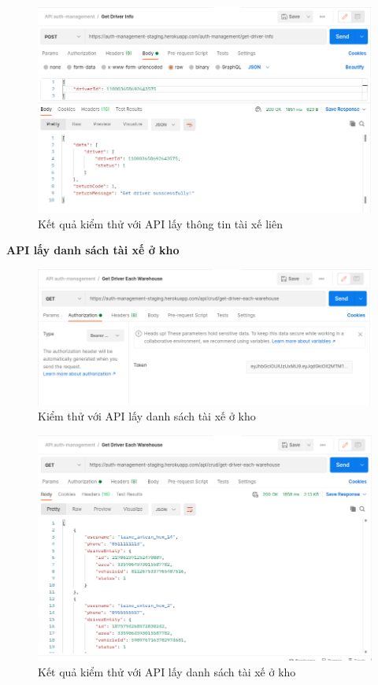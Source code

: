 		\begin{figure}[H]
			\includegraphics[width=1\textwidth]{Images/testing/API-get-driver-info-result.png}
			\centering
			\linebreak
			\caption{Kết quả kiểm thử với API lấy thông tin tài xế liên}
		\end{figure}
		
		\newpage
		\textbf{API lấy danh sách tài xế ở kho}
		
		\begin{figure}[H]
			\includegraphics[width=1\textwidth]{Images/testing/API-get-driver-warehouse.png}
			\centering
			\linebreak
			\caption{Kiểm thử với API lấy danh sách tài xế ở kho}
		\end{figure}
		
		\begin{figure}[H]
			\includegraphics[width=1\textwidth]{Images/testing/API-get-driver-warehouse-result.png}
			\centering
			\linebreak
			\caption{Kết quả kiểm thử với API lấy danh sách tài xế ở kho}
		\end{figure}
		
